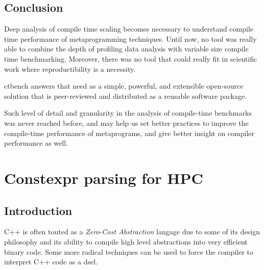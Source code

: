 \documentclass[english,12pt,a4paper]{book}
\providecommand{\cpp}{\textsc{C++}\xspace}
\begin{document}




\clearpage%

\section{
  Conclusion
}

Deep analysis of compile time scaling becomes necessary to understand
compile time performance of metaprogramming techniques.
Until now, no tool was really able to combine the depth of profiling data
analysis with variable size compile time benchmarking.
Moreover, there was no tool that could really fit in scientific work
where reproductibility is a necessity.

ctbench answers that need as a simple, powerful, and extensible
open-source solution that is peer-reviewed and distributed as a reusable
software package.

Such level of detail and granularity in the analysis of compile-time benchmarks
was never reached before, and may help us set better practices to improve the
compile-time performance of metaprograms, and give better insight on compiler
performance as well.

\chapter{
  Constexpr parsing for HPC
}

\section{Introduction}

\cpp is often touted as a \textit{Zero-Cost Abstraction} langage due to some of
its design philosophy and its ability to compile high level abstractions into
very efficient binary code. Some more radical techniques can be used to
force the compiler to interpret \cpp code as a \gls{dsel}.
\end{document}
